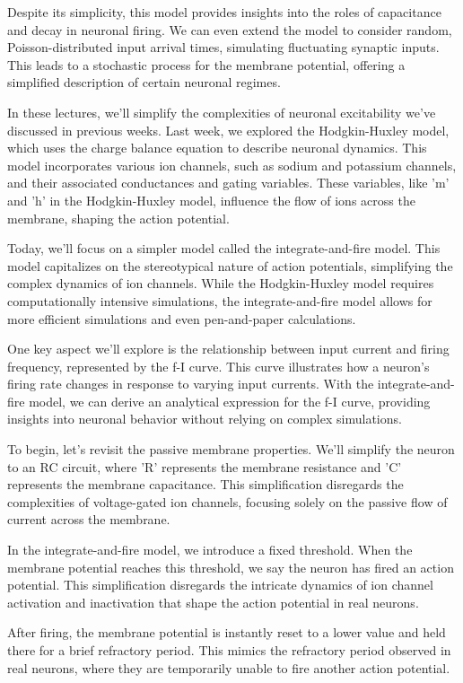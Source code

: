 Despite its simplicity, this model provides insights into the roles of capacitance and decay in neuronal firing. We can even extend the model to consider random, Poisson-distributed input arrival times, simulating fluctuating synaptic inputs. This leads to a stochastic process for the membrane potential, offering a simplified description of certain neuronal regimes.


In these lectures, we'll simplify the complexities of neuronal excitability we've discussed in previous weeks. Last week, we explored the Hodgkin-Huxley model, which uses the charge balance equation to describe neuronal dynamics. This model incorporates various ion channels, such as sodium and potassium channels, and their associated conductances and gating variables. These variables, like 'm' and 'h' in the Hodgkin-Huxley model, influence the flow of ions across the membrane, shaping the action potential.

Today, we'll focus on a simpler model called the integrate-and-fire model. This model capitalizes on the stereotypical nature of action potentials, simplifying the complex dynamics of ion channels. While the Hodgkin-Huxley model requires computationally intensive simulations, the integrate-and-fire model allows for more efficient simulations and even pen-and-paper calculations.

One key aspect we'll explore is the relationship between input current and firing frequency, represented by the f-I curve. This curve illustrates how a neuron's firing rate changes in response to varying input currents. With the integrate-and-fire model, we can derive an analytical expression for the f-I curve, providing insights into neuronal behavior without relying on complex simulations.

To begin, let's revisit the passive membrane properties. We'll simplify the neuron to an RC circuit, where 'R' represents the membrane resistance and 'C' represents the membrane capacitance. This simplification disregards the complexities of voltage-gated ion channels, focusing solely on the passive flow of current across the membrane.

In the integrate-and-fire model, we introduce a fixed threshold. When the membrane potential reaches this threshold, we say the neuron has fired an action potential. This simplification disregards the intricate dynamics of ion channel activation and inactivation that shape the action potential in real neurons.

After firing, the membrane potential is instantly reset to a lower value and held there for a brief refractory period. This mimics the refractory period observed in real neurons, where they are temporarily unable to fire another action potential.

